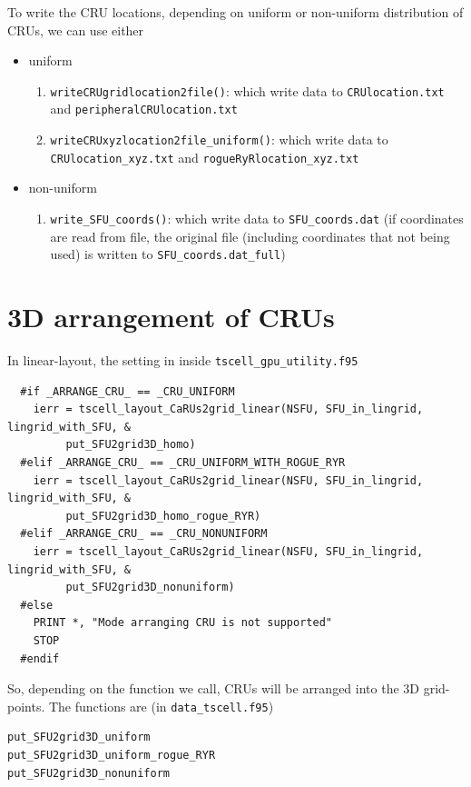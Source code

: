 To write the CRU locations, depending on uniform or non-uniform distribution of
CRUs, we can use either
\begin{itemize}
  \item uniform
\begin{enumerate}
  \item \verb!writeCRUgridlocation2file()!: which write data to
  \verb!CRUlocation.txt! and \verb!peripheralCRUlocation.txt!
  \item \verb!writeCRUxyzlocation2file_uniform()!: which write data to
  \verb!CRUlocation_xyz.txt! and \verb!rogueRyRlocation_xyz.txt! 
\end{enumerate}
\item non-uniform
\begin{enumerate}
  \item \verb!write_SFU_coords()!: which write data to
  \verb!SFU_coords.dat! (if coordinates are read from file, the original file
  (including coordinates that not being used) is written to
  \verb!SFU_coords.dat_full!)
\end{enumerate}
\end{itemize}

\section{3D arrangement of CRUs}
\label{sec:CRU_3D_layouts}

In linear-layout, the setting in inside \verb!tscell_gpu_utility.f95!
\begin{verbatim}
  #if _ARRANGE_CRU_ == _CRU_UNIFORM    
    ierr = tscell_layout_CaRUs2grid_linear(NSFU, SFU_in_lingrid, lingrid_with_SFU, &
         put_SFU2grid3D_homo)
  #elif _ARRANGE_CRU_ == _CRU_UNIFORM_WITH_ROGUE_RYR
    ierr = tscell_layout_CaRUs2grid_linear(NSFU, SFU_in_lingrid, lingrid_with_SFU, &
         put_SFU2grid3D_homo_rogue_RYR)
  #elif _ARRANGE_CRU_ == _CRU_NONUNIFORM
    ierr = tscell_layout_CaRUs2grid_linear(NSFU, SFU_in_lingrid, lingrid_with_SFU, &
         put_SFU2grid3D_nonuniform)
  #else
    PRINT *, "Mode arranging CRU is not supported"
    STOP
  #endif
\end{verbatim}

So, depending on the function we call, CRUs will be arranged into the 3D
grid-points. The functions are (in \verb!data_tscell.f95!)
\begin{verbatim}
put_SFU2grid3D_uniform
put_SFU2grid3D_uniform_rogue_RYR
put_SFU2grid3D_nonuniform
\end{verbatim}

